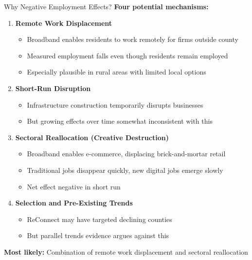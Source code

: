 \documentclass[aspectratio=169]{beamer}
\begin{document}
\begin{frame}{Why Negative Employment Effects?}
\textbf{Four potential mechanisms:}

\begin{enumerate}
    \item \textbf{Remote Work Displacement}
    \begin{itemize}
        \item Broadband enables residents to work remotely for firms outside county
        \item Measured employment falls even though residents remain employed
        \item Especially plausible in rural areas with limited local options
    \end{itemize}
    
    
    
    \item \textbf{Short-Run Disruption}
    \begin{itemize}
        \item Infrastructure construction temporarily disrupts businesses
        \item But growing effects over time somewhat inconsistent with this
    \end{itemize}
    
    
    
    \item \textbf{Sectoral Reallocation (Creative Destruction)}
    \begin{itemize}
        \item Broadband enables e-commerce, displacing brick-and-mortar retail
        \item Traditional jobs disappear quickly, new digital jobs emerge slowly
        \item Net effect negative in short run
    \end{itemize}
    
    
    
    \item \textbf{Selection and Pre-Existing Trends}
    \begin{itemize}
        \item ReConnect may have targeted declining counties
        \item But parallel trends evidence argues against this
    \end{itemize}
\end{enumerate}

\vspace{0.2cm}

\textbf{Most likely:} Combination of remote work displacement and sectoral reallocation
\end{frame}
\end{document}

